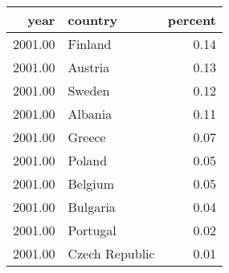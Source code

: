 \begin{table}[ht]
\centering
\begin{tabular}{rlr}
  \hline
year & country & percent \\ 
  \hline
2001.00 & Finland & 0.14 \\ 
  2001.00 & Austria & 0.13 \\ 
  2001.00 & Sweden & 0.12 \\ 
  2001.00 & Albania & 0.11 \\ 
  2001.00 & Greece & 0.07 \\ 
  2001.00 & Poland & 0.05 \\ 
  2001.00 & Belgium & 0.05 \\ 
  2001.00 & Bulgaria & 0.04 \\ 
  2001.00 & Portugal & 0.02 \\ 
  2001.00 & Czech Republic & 0.01 \\ 
   \hline
\end{tabular}
\end{table}
